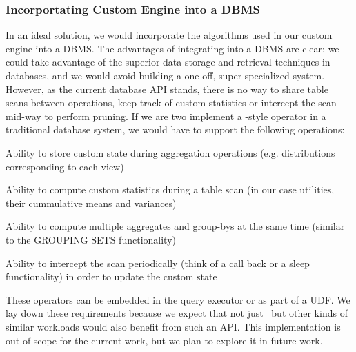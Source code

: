 \subsubsection{Incorportating Custom Engine into a DBMS}
\label{sec:incorporating}
In an ideal solution, we would incorporate the algorithms used in our custom
engine into a DBMS. 
The advantages of integrating into a DBMS are clear: we could take advantage of
the superior data storage and retrieval techniques in databases, and we would
avoid building a one-off, super-specialized system.
However, as the current database API stands, there is no way to share table
scans between operations, keep track of custom statistics or intercept the scan
mid-way to perform pruning.
If we are two implement a \VizRecDB-style operator in a traditional database
system, we would have to support the following operations:
\squishlist
\item Ability to store custom state during aggregation operations (e.g.
distributions corresponding to each view)
\item Ability to compute custom statistics during a table scan (in our case
utilities, their cummulative means and variances)
\item Ability to compute multiple aggregates and group-bys at the same time
(similar to the GROUPING SETS functionality)
\item Ability to intercept the scan periodically (think of a call back or a
sleep functionality) in order to update the custom state
\squishend

These operators can be embedded in the query executor or as part of a UDF.
We lay down these requirements because we expect that not just \VizRecDB\ but
other kinds of similar workloads would also benefit from such an API.
This implementation is out of scope for the current work, but we plan to explore
it in future work.
